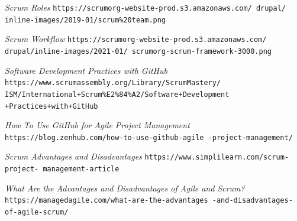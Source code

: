 \documentclass{beamer}
\begin{document}
\begin{frame}[allowframebreaks]

	\begin{thebibliography}{10}


	\textit{Scrum Roles}
	\texttt{https://scrumorg-website-prod.s3.amazonaws.com/
	drupal/	inline-images/2019-01/scrum\%20team.png}

	\textit{Scrum Workflow}
	\texttt{https://scrumorg-website-prod.s3.amazonaws.com/
	drupal/inline-images/2021-01/
	scrumorg-scrum-framework-3000.png}

	\textit{Software Development Practices with GitHub}
	\texttt{https://www.scrumassembly.org/Library/ScrumMastery/
	ISM/International+Scrum\%E2\%84\%A2/Software+Development
	+Practices+with+GitHub}

	\framebreak

	\textit{How To Use GitHub for Agile Project Management}
	\texttt{https://blog.zenhub.com/how-to-use-github-agile
	-project-management/}

	\textit{Scrum Advantages and Disadvantages}
	\texttt{https://www.simplilearn.com/scrum-project-
	management-article}

	\textit{What Are the Advantages and Disadvantages of Agile and Scrum?}
	\texttt{https://managedagile.com/what-are-the-advantages
	-and-disadvantages-of-agile-scrum/}

	\end{thebibliography}

\end{frame}
\end{document}
